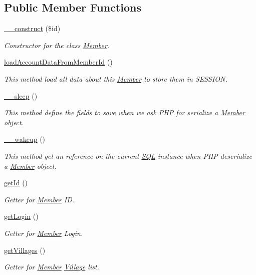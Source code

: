 \subsection*{Public Member Functions}
\begin{DoxyCompactItemize}
\item 
\mbox{\hyperlink{classMember_adfd583576ca6cc09f0f8868ac7c75f3a}{\+\_\+\+\_\+construct}} (\$id)
\begin{DoxyCompactList}\small\item\em Constructor for the class \mbox{\hyperlink{classMember}{Member}}. \end{DoxyCompactList}\item 
\mbox{\hyperlink{classMember_a9624c3631bc10fbc592380353e537928}{load\+Account\+Data\+From\+Member\+Id}} ()
\begin{DoxyCompactList}\small\item\em This method load all data about this \mbox{\hyperlink{classMember}{Member}} to store them in S\+E\+S\+S\+I\+ON. \end{DoxyCompactList}\item 
\mbox{\hyperlink{classMember_a08bdbef60afdd66ea4e1f3c2404d6b6f}{\+\_\+\+\_\+sleep}} ()
\begin{DoxyCompactList}\small\item\em This method define the fields to save when we ask P\+HP for serialize a \mbox{\hyperlink{classMember}{Member}} object. \end{DoxyCompactList}\item 
\mbox{\label{classMember_ad9f31b2c9942ffcf8f6cd99590307e66}} 
\mbox{\hyperlink{classMember_ad9f31b2c9942ffcf8f6cd99590307e66}{\+\_\+\+\_\+wakeup}} ()
\begin{DoxyCompactList}\small\item\em This method get an reference on the current \mbox{\hyperlink{classSQL}{S\+QL}} instance when P\+HP deserialize a \mbox{\hyperlink{classMember}{Member}} object. \end{DoxyCompactList}\item 
\mbox{\hyperlink{classMember_a4c2dcf5c05164f9575bc01237756109f}{get\+Id}} ()
\begin{DoxyCompactList}\small\item\em Getter for \mbox{\hyperlink{classMember}{Member}} ID. \end{DoxyCompactList}\item 
\mbox{\hyperlink{classMember_a24f3ec8686336825d65d4c3ce1ca995a}{get\+Login}} ()
\begin{DoxyCompactList}\small\item\em Getter for \mbox{\hyperlink{classMember}{Member}} Login. \end{DoxyCompactList}\item 
\mbox{\hyperlink{classMember_a8fffb15679150731080b062cf4770f7d}{get\+Villages}} ()
\begin{DoxyCompactList}\small\item\em Getter for \mbox{\hyperlink{classMember}{Member}} \mbox{\hyperlink{classVillage}{Village}} list. \end{DoxyCompactList}\end{DoxyCompactItemize}
